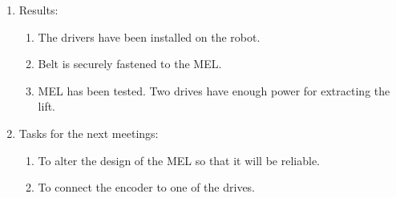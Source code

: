 \begin{enumerate}
\begin{enumerate}
    \end{enumerate}
    
	\item Results: 
	\begin{enumerate}
	  \item	The drivers have been installed on the robot.
	  
	  \item	Belt is securely fastened to the MEL.
	  
	  \item	MEL has been tested. Two drives have enough power for extracting the lift.
	  
    \end{enumerate}
    
	\item Tasks for the next meetings:
	\begin{enumerate}
	  \item To alter the design of the MEL so that it will be reliable.
	  
	  \item To connect the encoder to one of the drives.
	  
    \end{enumerate}     
\end{enumerate}
\fillpage
